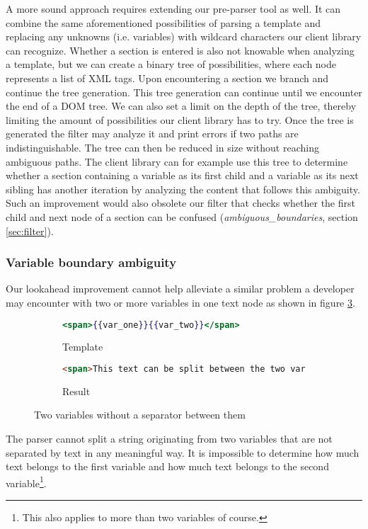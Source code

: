\documentclass[thesis.tex]{subfiles}
\begin{document}
A more sound approach requires extending our pre-parser tool as well. It can
combine the same aforementioned possibilities of parsing a template and
replacing any unknowns (i.e. variables) with wildcard characters our client
library can recognize. Whether a section is entered is also not knowable when
analyzing a template, but we can create a binary tree of possibilities,
where each node represents a list of XML tags. Upon encountering a section we
branch and continue the tree generation. This tree generation can continue until
we encounter the end of a DOM tree. We can also set a limit on the depth of the
tree, thereby limiting the amount of possibilities our client library has to
try. Once the tree is generated the filter may analyze it and print errors if
two paths are indistinguishable. The tree can then be reduced in size without
reaching ambiguous paths.
The client library can for example use this tree to determine whether a
section containing a variable as its first child and a variable as its
next sibling has another iteration by analyzing the content that follows this
ambiguity.
Such an improvement would also obsolete our filter that checks whether the
first child and next node of a section can be confused
(\emph{ambiguous\_boundaries}, section \ref{sec:filter}).

\subsubsection{Variable boundary ambiguity}
\label{sec:var-boundary-ambiguity}
Our lookahead improvement cannot help alleviate a similar problem a developer
may encounter with two or more variables in one text node as shown in figure 
\ref{fig:twovars-no-sep}.
\begin{figure}
	\centering
	\begin{subfigure}{\textwidth}
		\caption{Template}
		\label{fig:twovars-no-sep.mustache}
		\begin{lstlisting}[language=mustache]
<span>{{var_one}}{{var_two}}</span>
		\end{lstlisting}
	\end{subfigure}
	
	\begin{subfigure}{\textwidth}
		\caption{Result}
		\label{fig:twovars-no-sep.html}
		\begin{lstlisting}[language=HTML]
<span>This text can be split between the two variables or belong to only one.</span>
		\end{lstlisting}
	\end{subfigure}
	\caption{Two variables without a separator between them}
	\label{fig:twovars-no-sep}
\end{figure}
The parser cannot split a string originating from two variables that are not
separated by text in any meaningful way. It is impossible to determine how much
text belongs to the first variable and how much text belongs to the second
variable\footnote{This also applies to more than two variables of course.}.
\end{document}
